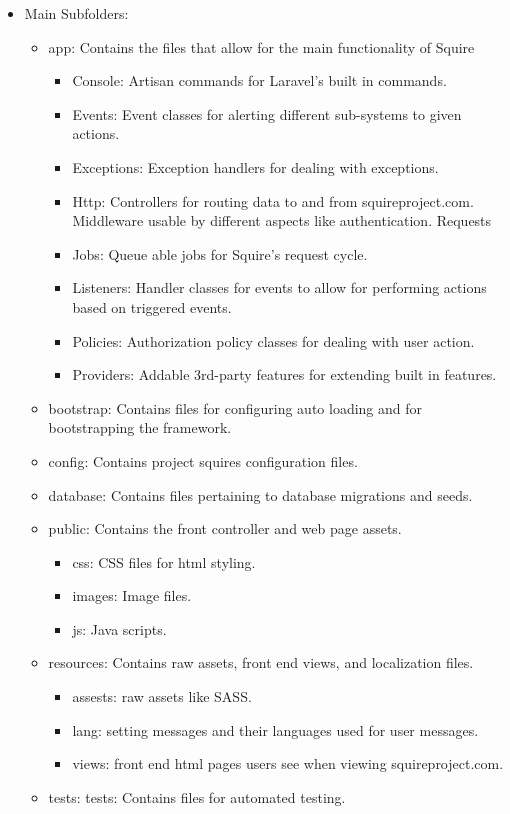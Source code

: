\documentclass[11pt]{report}
\begin{document}
    \begin{itemize}
        \item Main Subfolders:
        \begin{itemize}
            \item app: Contains the files that allow for the main functionality of Squire
            \begin{itemize}
                \item Console: Artisan commands for Laravel’s built in commands.
                \item Events: Event classes for alerting different sub-systems to given actions.
                \item Exceptions: Exception handlers for dealing with exceptions.
                \item Http: Controllers for routing data to and from squireproject.com. Middleware usable by different aspects like authentication. Requests
                \item Jobs: Queue able jobs for Squire’s request cycle.
                \item Listeners: Handler classes for events to allow for performing actions based on triggered events.
                \item Policies: Authorization policy classes for dealing with user action.
                \item Providers: Addable 3rd-party features for extending built in features.
            \end{itemize}
            \item bootstrap: Contains files for configuring auto loading and for bootstrapping the framework.
            \item config: Contains project squires configuration files.
            \item database: Contains files pertaining to database migrations and seeds.
            \item public: Contains the front controller and web page assets.
            \begin{itemize}
                \item css: CSS files for html styling.
                \item images: Image files.
                \item js: Java scripts.
            \end{itemize}
            \item resources: Contains raw assets, front end views, and localization files.
            \begin{itemize}
                \item assests: raw assets like SASS.
                \item lang: setting messages and their languages used for user messages.
                \item views: front end html pages users see when viewing squireproject.com.
            \end{itemize}
            \item tests: tests: Contains files for automated testing.
        \end{itemize}
    \end{itemize}
    
\end{document}
